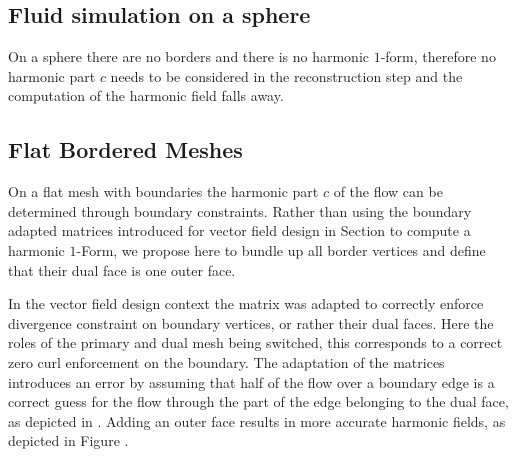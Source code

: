 \subsection{Fluid simulation on a sphere}
On a sphere there are no borders and there is no harmonic $1$-form, therefore no harmonic part $c$ needs to be considered in the reconstruction step and the computation of the harmonic field falls away.

\subsection{Flat Bordered Meshes}
On a flat mesh with boundaries the harmonic part $c$ of the flow can be determined through boundary constraints. Rather than using the boundary adapted matrices introduced for vector field design in Section  to compute a harmonic $1$-Form, we propose here to bundle up all border vertices and define that their dual face is one outer face. 

In the vector field design context the matrix was adapted to correctly enforce divergence constraint on boundary vertices, or rather their dual faces. Here the roles of the primary and dual mesh being switched, this corresponds to a correct zero curl enforcement on the boundary. The adaptation of the matrices introduces an error by assuming that half of the flow over a boundary edge is a correct guess for the flow through the part of the edge belonging to the dual face, as depicted in . Adding an outer face results in more accurate harmonic fields, as depicted in Figure .


